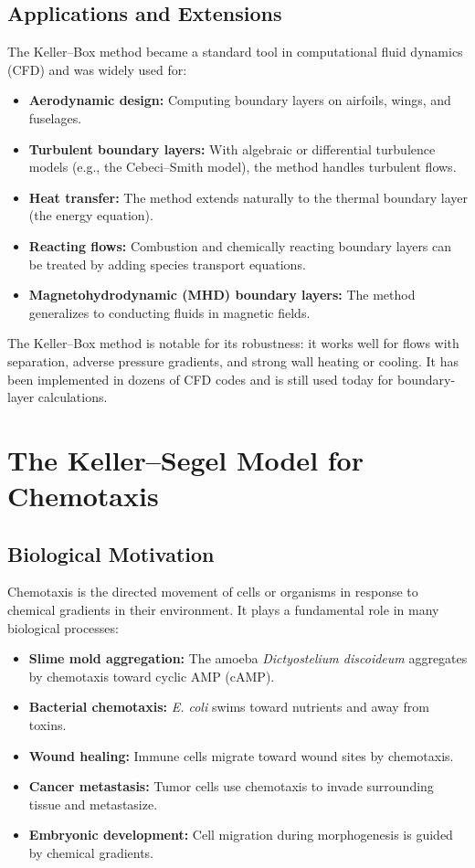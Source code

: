 \subsection{Applications and Extensions}

The Keller--Box method became a standard tool in computational fluid dynamics (CFD) and was widely used for:

\begin{itemize}
  \item \textbf{Aerodynamic design:} Computing boundary layers on airfoils, wings, and fuselages.
  \item \textbf{Turbulent boundary layers:} With algebraic or differential turbulence models (e.g., the Cebeci--Smith model), the method handles turbulent flows.
  \item \textbf{Heat transfer:} The method extends naturally to the thermal boundary layer (the energy equation).
  \item \textbf{Reacting flows:} Combustion and chemically reacting boundary layers can be treated by adding species transport equations.
  \item \textbf{Magnetohydrodynamic (MHD) boundary layers:} The method generalizes to conducting fluids in magnetic fields.
\end{itemize}

The Keller--Box method is notable for its robustness: it works well for flows with separation, adverse pressure gradients, and strong wall heating or cooling. It has been implemented in dozens of CFD codes and is still used today for boundary-layer calculations.

\section{The Keller--Segel Model for Chemotaxis}

\subsection{Biological Motivation}

Chemotaxis is the directed movement of cells or organisms in response to chemical gradients in their environment. It plays a fundamental role in many biological processes:

\begin{itemize}
  \item \textbf{Slime mold aggregation:} The amoeba \textit{Dictyostelium discoideum} aggregates by chemotaxis toward cyclic AMP (cAMP).
  \item \textbf{Bacterial chemotaxis:} \textit{E. coli} swims toward nutrients and away from toxins.
  \item \textbf{Wound healing:} Immune cells migrate toward wound sites by chemotaxis.
  \item \textbf{Cancer metastasis:} Tumor cells use chemotaxis to invade surrounding tissue and metastasize.
  \item \textbf{Embryonic development:} Cell migration during morphogenesis is guided by chemical gradients.
\end{itemize}

